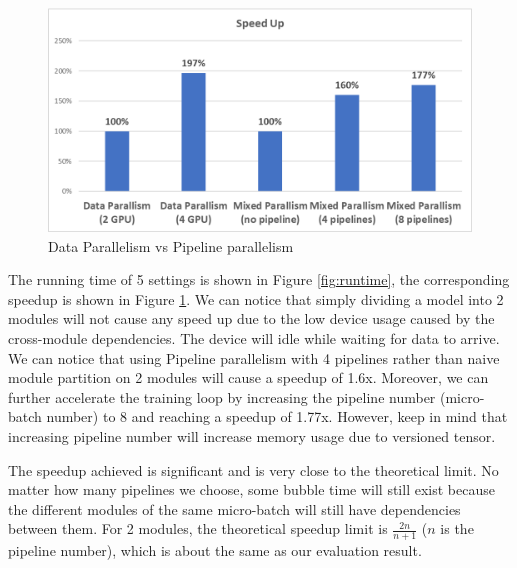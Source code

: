 \documentclass[sigplan, nonacm]{acmart}\settopmatter{printfolios=true,printccs=false,printacmref=false}
\begin{document}
\begin{figure}[htbp]
  \centering
  \includegraphics[scale=0.5]{pipelineparallelspeedup.png}
  \caption{Data Parallelism vs Pipeline parallelism}
  \label{fig:speedup}
\end{figure}
 The running time of 5 settings is shown in Figure \ref{fig:runtime}, the corresponding speedup is shown in Figure \ref{fig:speedup}. We can notice that simply dividing a model into 2 modules will not cause any speed up due to the low device usage caused by the cross-module dependencies. The device will idle while waiting for data to arrive. We can notice that using Pipeline parallelism with 4 pipelines rather than naive module partition on 2 modules will cause a speedup of 1.6x. Moreover, we can further accelerate the training loop by increasing the pipeline number (micro-batch number) to 8 and reaching a speedup of 1.77x. However, keep in mind that increasing pipeline number will increase memory usage due to versioned tensor.\par
 The speedup achieved is significant and is very close to the theoretical limit. No matter how many pipelines we choose, some bubble time will still exist because the different modules of the same micro-batch will still have dependencies between them. For 2 modules, the theoretical speedup limit is $\frac{2n}{n+1}$ ($n$ is the pipeline number), which is about the same as our evaluation result.\par
\end{document}
